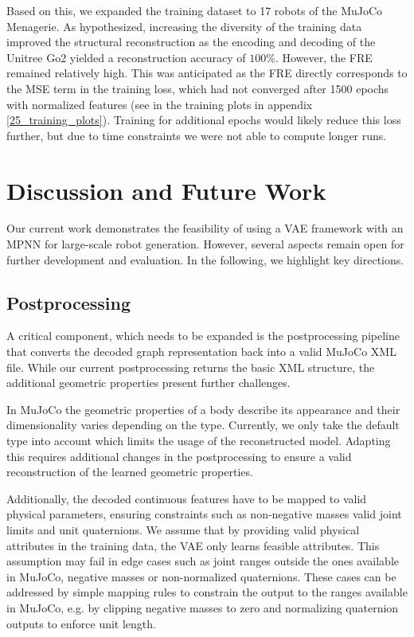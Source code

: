 \documentclass{article}
\theoremstyle{plain}
\theoremstyle{definition}
\theoremstyle{remark}
\begin{document}
Based on this, we expanded the training dataset to 17 robots of the MuJoCo Menagerie. As hypothesized, increasing the diversity of the training data improved the structural reconstruction as the encoding and decoding of the Unitree Go2 yielded a reconstruction accuracy of $100\%$. However, the FRE remained relatively high. This was anticipated as the FRE directly corresponds to the MSE term in the training loss, which had not converged after 1500 epochs with normalized features (see in the training plots in appendix \ref{25_training_plots}). Training for additional epochs would likely reduce this loss further, but due to time constraints we were not able to compute longer runs.

\section{Discussion and Future Work}
Our current work demonstrates the feasibility of using a VAE framework with an MPNN for large-scale robot generation. However, several aspects remain open for further development and evaluation. In the following, we highlight key directions.

\subsection{Postprocessing}
A critical component, which needs to be expanded is the postprocessing pipeline that converts the decoded graph representation back into a valid MuJoCo XML file. While our current postprocessing returns the basic XML structure, the  additional geometric properties present further challenges. 

In MuJoCo the geometric properties of a body describe its appearance and their dimensionality varies depending on the type. Currently, we only take the default type into account which limits the usage of the reconstructed model. Adapting this requires additional changes in the postprocessing to ensure a valid reconstruction of the learned geometric properties. 

Additionally, the decoded continuous features have to be mapped to valid physical parameters, ensuring constraints such as non-negative masses valid joint limits and unit quaternions. We assume that by providing valid physical attributes in the training data, the VAE only learns feasible attributes. This assumption may fail in edge cases such as joint ranges outside the ones available in MuJoCo, negative masses or non-normalized quaternions. These cases can be addressed by simple mapping rules to constrain the output to the ranges available in MuJoCo, e.g. by clipping negative masses to zero and normalizing quaternion outputs to enforce unit length. 
\end{document}
